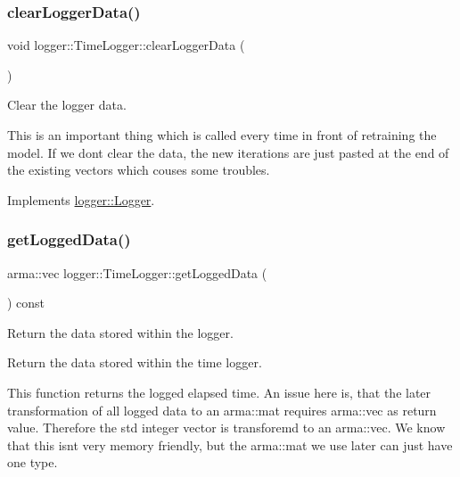 \subsubsection{\texorpdfstring{clear\+Logger\+Data()}{clearLoggerData()}}
{\footnotesize\ttfamily void logger\+::\+Time\+Logger\+::clear\+Logger\+Data (\begin{DoxyParamCaption}{ }\end{DoxyParamCaption})\hspace{0.3cm}{\ttfamily [virtual]}}



Clear the logger data. 

This is an important thing which is called every time in front of retraining the model. If we don\textquotesingle{}t clear the data, the new iterations are just pasted at the end of the existing vectors which couses some troubles. 

Implements \mbox{\hyperlink{classlogger_1_1_logger_a8c68db2430fa84b67528bfa6ae45a516}{logger\+::\+Logger}}.

\mbox{\label{classlogger_1_1_time_logger_a1603279c79e69795133f1be9f3238d64}} 
\subsubsection{\texorpdfstring{get\+Logged\+Data()}{getLoggedData()}}
{\footnotesize\ttfamily arma\+::vec logger\+::\+Time\+Logger\+::get\+Logged\+Data (\begin{DoxyParamCaption}{ }\end{DoxyParamCaption}) const\hspace{0.3cm}{\ttfamily [virtual]}}



Return the data stored within the logger. 

Return the data stored within the time logger.

This function returns the logged elapsed time. An issue here is, that the later transformation of all logged data to an {\ttfamily arma\+::mat} requires {\ttfamily arma\+::vec} as return value. Therefore the std integer vector is transforemd to an {\ttfamily arma\+::vec}. We know that this isn\textquotesingle{}t very memory friendly, but the {\ttfamily arma\+::mat} we use later can just have one type.

